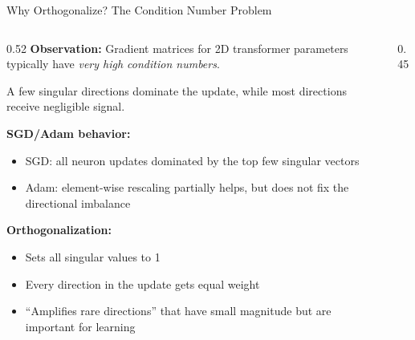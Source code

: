 \begin{frame}{Why Orthogonalize? The Condition Number Problem}

  \begin{columns}[T]
    \begin{column}{0.52\textwidth}
      \textbf{Observation:} Gradient matrices for 2D transformer parameters typically have \emph{very high condition numbers}.

      \vspace{0.3em}
      A few singular directions dominate the update, while most directions receive negligible signal.

      \vspace{0.3em}
      \textbf{SGD/Adam behavior:}
      \begin{itemize}
        \item SGD: all neuron updates dominated by the top few singular vectors
        \item Adam: element-wise rescaling partially helps, but does not fix the directional imbalance
      \end{itemize}

      \vspace{0.3em}
      \textbf{Orthogonalization:}
      \begin{itemize}
        \item Sets all singular values to 1
        \item Every direction in the update gets equal weight
        \item ``Amplifies rare directions'' that have small magnitude but are important for learning
      \end{itemize}
    \end{column}
    \begin{column}{0.45\textwidth}
      \begin{center}
\end{center}
\end{column}
\end{columns}
\end{frame}
